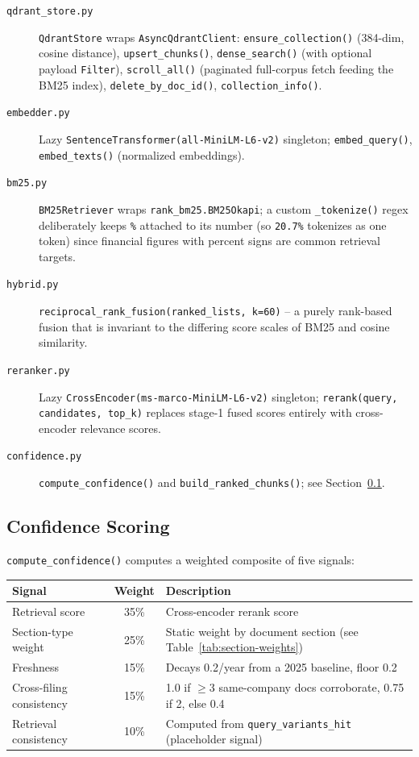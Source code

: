 \documentclass[11pt,a4paper]{report}
\newcommand{\code}[1]{\texttt{#1}}
\newcommand{\file}[1]{\texttt{\small #1}}
\begin{document}
\begin{description}
    \item[\file{qdrant\_store.py}] \code{QdrantStore} wraps \code{AsyncQdrantClient}:
    \code{ensure\_collection()} (384-dim, cosine distance), \code{upsert\_chunks()},
    \code{dense\_search()} (with optional payload \code{Filter}), \code{scroll\_all()}
    (paginated full-corpus fetch feeding the BM25 index), \code{delete\_by\_doc\_id()},
    \code{collection\_info()}.
    \item[\file{embedder.py}] Lazy \code{SentenceTransformer(all-MiniLM-L6-v2)}
    singleton; \code{embed\_query()}, \code{embed\_texts()} (normalized embeddings).
    \item[\file{bm25.py}] \code{BM25Retriever} wraps \code{rank\_bm25.BM25Okapi}; a
    custom \code{\_tokenize()} regex deliberately keeps \code{\%} attached to its
    number (so \code{20.7\%} tokenizes as one token) since financial figures with
    percent signs are common retrieval targets.
    \item[\file{hybrid.py}] \code{reciprocal\_rank\_fusion(ranked\_lists, k=60)} -- a
    purely rank-based fusion that is invariant to the differing score scales of BM25
    and cosine similarity.
    \item[\file{reranker.py}] Lazy \code{CrossEncoder(ms-marco-MiniLM-L6-v2)}
    singleton; \code{rerank(query, candidates, top\_k)} replaces stage-1 fused scores
    entirely with cross-encoder relevance scores.
    \item[\file{confidence.py}] \code{compute\_confidence()} and
    \code{build\_ranked\_chunks()}; see Section~\ref{sec:confidence}.
\end{description}

\subsection{Confidence Scoring}
\label{sec:confidence}

\code{compute\_confidence()} computes a weighted composite of five signals:

\begin{center}
\begin{tabular}{@{}lcl@{}}
\toprule
\textbf{Signal} & \textbf{Weight} & \textbf{Description} \\
\midrule
Retrieval score & 35\% & Cross-encoder rerank score \\
Section-type weight & 25\% & Static weight by document section (see Table~\ref{tab:section-weights}) \\
Freshness & 15\% & Decays 0.2/year from a 2025 baseline, floor 0.2 \\
Cross-filing consistency & 15\% & 1.0 if $\geq$3 same-company docs corroborate, 0.75 if 2, else 0.4 \\
Retrieval consistency & 10\% & Computed from \code{query\_variants\_hit} (placeholder signal) \\
\bottomrule
\end{tabular}
\end{center}
\end{document}
